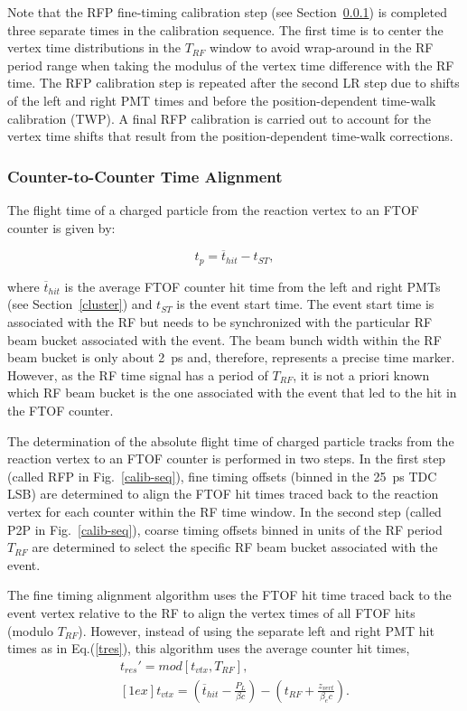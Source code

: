 \documentclass[3p,times,twocolumn]{elsarticle}
\begin{document}
Note that the RFP fine-timing calibration step (see Section~\ref{sec-talign}) is completed three separate
times in the calibration sequence. The first time is to center the vertex time distributions in the $T_{RF}$
window to avoid wrap-around in the RF period range when taking the modulus of the vertex time difference
with the RF time. The RFP calibration step is repeated after the second LR step due to shifts of the left
and right PMT times and before the position-dependent time-walk calibration (TWP). A final RFP calibration
is carried out to account for the vertex time shifts that result from the position-dependent time-walk
corrections.

\subsubsection{Counter-to-Counter Time Alignment}
\label{sec-talign}

The flight time of a charged particle from the reaction vertex to an FTOF counter is given by:

\begin{equation}
t_p = \overline{t}_{hit} - t_{ST},
\end{equation}

\noindent
where $\overline{t}_{hit}$ is the average FTOF counter hit time from the left and right PMTs (see
Section~\ref{cluster}) and $t_{ST}$ is the event start time. The event start time is associated with the
RF but needs to be synchronized with the particular RF beam bucket associated with the event. The
beam bunch width within the RF beam bucket is only about 2~ps and, therefore, represents a precise time
marker. However, as the RF time signal has a period of $T_{RF}$, it is not a priori known which RF beam
bucket is the one associated with the event that led to the hit in the FTOF counter.

The determination of the absolute flight time of charged particle tracks from the reaction vertex to an
FTOF counter is performed in two steps. In the first step (called RFP in Fig.~\ref{calib-seq}), fine timing
offsets (binned in the 25~ps TDC LSB) are determined to align the FTOF hit times traced back to the
reaction vertex for each counter within the RF time window. In the second step (called P2P in
Fig.~\ref{calib-seq}), coarse timing offsets binned in units of the RF period $T_{RF}$ are determined to
select the specific RF beam bucket associated with the event.

The fine timing alignment algorithm uses the FTOF hit time traced back to the event vertex relative
to the RF to align the vertex times of all FTOF hits (modulo $T_{RF}$). However, instead of using the
separate left and right PMT hit times as in Eq.(\ref{tres}), this algorithm uses the average counter
hit times, 
\begin{eqnarray}
t_{res}' = mod \left[ t_{vtx}, T_{RF} \right], ~~~~~\\ [1ex]
t_{vtx} = \left(\overline{t}_{hit} - \frac{P_L}{\beta c} \right) - 
\left(t_{RF} + \frac{z_{vert}}{\beta_e c} \right). \nonumber
\end{eqnarray}
\end{document}
